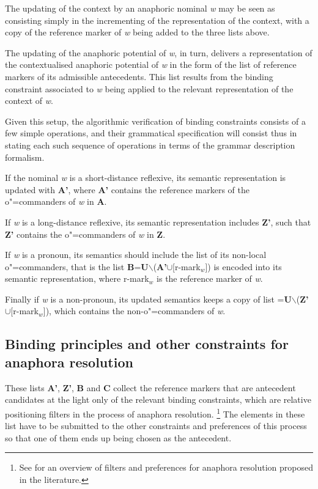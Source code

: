 \documentclass[output=paper
,modfonts
,nonflat]{langsci/langscibook}
\begin{document}
The updating of the context by an anaphoric nominal {\it w} may be seen
as consisting simply in the
incrementing of the representation of the context, with 
a copy of the reference marker of {\it w} being added to
the three lists above.


The updating of the anaphoric potential of {\it w}, in turn, delivers a representation
of the contextualised anaphoric potential of {\it w} in the form of the
list of reference markers of its admissible antecedents. This list
results from the binding constraint associated to {\it w} being applied  to
the relevant representation of the context of {\it w}.

Given this setup, the algorithmic verification of 
binding constraints consists of a few simple operations, and their
grammatical specification will consist thus in stating each such sequence of
operations in terms of the grammar description formalism. 

If the nominal {\it w} is a short-distance
reflexive, its semantic  representation is updated with {\bf A'}, where {\bf A'}
contains the reference  markers of the \mbox{o"=commanders} of {\it w} in {\bf A}. 

If {\it w} is a
long-distance  reflexive, its semantic representation includes {\bf Z'}, such that {\bf Z'}
contains the \mbox{o"=commanders} of {\it w} in {\bf Z}. 

If {\it w} is a pronoun, its semantics 
should include the list of its non-local \linebreak o"=commanders,
that is the list
{\bf B}={\bf U}$\backslash$({\bf A'}$\cup$[r-mark$_{w}$])
is encoded into its semantic representation, where r-mark$_{w}$ is the reference marker
of {\it w}.

Finally if {\it w} 
is a non-pronoun, its updated semantics keeps a copy of 
list ={\bf U}$\backslash$({\bf Z'}$\cup$[r-mark$_{w}$]),
which contains the non-o"=commanders of {\it w}.


\subsection{Binding principles and other constraints for anaphora resolution}

These lists {\bf A'}, {\bf Z'}, {\bf B} and {\bf C} collect
the reference markers that are antecedent candidates
at the light only of the relevant binding constraints, which are
relative positioning filters in the process of anaphora resolution.%
%
\footnote{See \cite[Chap.2]{branco:diss99} for an overview
of filters and preferences for anaphora resolution proposed in the literature.
}
% 
The elements in these list have to be submitted to the other constraints and preferences
of this process so that one of them ends up 
being chosen as the antecedent.
\end{document}
